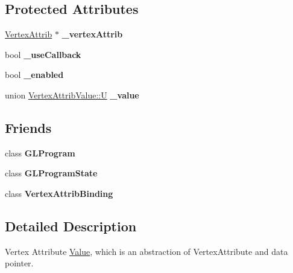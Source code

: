 \subsection*{Protected Attributes}
\begin{DoxyCompactItemize}
\item 
\mbox{\label{classVertexAttribValue_aa42c67aa15feddfed242398a1355d39e}} 
\hyperlink{structVertexAttrib}{Vertex\+Attrib} $\ast$ {\bfseries \+\_\+vertex\+Attrib}
\item 
\mbox{\label{classVertexAttribValue_a43d0672719d976a32c4e8acb0ea3f92d}} 
bool {\bfseries \+\_\+use\+Callback}
\item 
\mbox{\label{classVertexAttribValue_a71859528a91d817f9db83e23979c2635}} 
bool {\bfseries \+\_\+enabled}
\item 
\mbox{\label{classVertexAttribValue_a09805cabd8c4b9871d36fd8a57a6dc73}} 
union \hyperlink{unionVertexAttribValue_1_1U}{Vertex\+Attrib\+Value\+::U} {\bfseries \+\_\+value}
\end{DoxyCompactItemize}
\subsection*{Friends}
\begin{DoxyCompactItemize}
\item 
\mbox{\label{classVertexAttribValue_a093a19c3860a594a811229dda18dca73}} 
class {\bfseries G\+L\+Program}
\item 
\mbox{\label{classVertexAttribValue_ae18eab2cdc34c4231ddade1d262fab25}} 
class {\bfseries G\+L\+Program\+State}
\item 
\mbox{\label{classVertexAttribValue_af0e093b7754b8ed07c6283d3f7083bca}} 
class {\bfseries Vertex\+Attrib\+Binding}
\end{DoxyCompactItemize}


\subsection{Detailed Description}
Vertex Attribute \hyperlink{classValue}{Value}, which is an abstraction of Vertex\+Attribute and data pointer.

